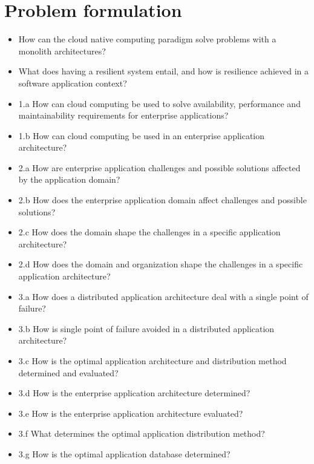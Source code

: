 \section{Problem formulation}
\label{sc:problem_formulation}

\begin{itemize}
\item How can the cloud native computing paradigm solve problems with a monolith architectures?
\item What does having a resilient system entail, and how is resilience achieved in a software application context?
\end{itemize}




\newpage
{}
\begin{itemize}  
\item 1.a How can cloud computing be used to solve availability, performance and maintainability requirements for enterprise applications?
\item 1.b How can cloud computing be used in an enterprise application architecture?

\item 2.a How are enterprise application challenges and possible solutions affected by the application domain?
\item 2.b How does the enterprise application domain affect challenges and possible solutions?
\item 2.c How does the domain shape the challenges in a specific application architecture?
\item 2.d How does the domain and organization shape the challenges in a specific application architecture?

\item 3.a How does a distributed application architecture deal with a single point of failure?
\item 3.b How is single point of failure avoided in a distributed application architecture?
\item 3.c How is the optimal application architecture and distribution method determined and evaluated?
\item 3.d How is the enterprise application architecture determined?
\item 3.e How is the enterprise application architecture evaluated?
\item 3.f What determines the optimal application distribution method?
\item 3.g How is the optimal application database determined?
\end{itemize}